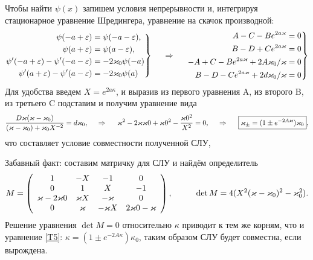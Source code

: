 Чтобы найти $\psi(x)$ запишем условия непрерывности и, интегрируя стационарное уравнение Шредингера, уравнение на скачок производной:
\begin{equation*}
    \left.\begin{aligned}
        \psi(-a+\varepsilon) &= \psi(-a-\varepsilon), \\
        \psi(a+\varepsilon) &= \psi(a-\varepsilon), \\
        \psi'(-a+\varepsilon) - \psi'(-a-\varepsilon) &= -2 \kappa_0 \psi(-a) \\
        \psi'(a+\varepsilon) - \psi'(a-\varepsilon) &= -2 \kappa_0 \psi(a) 
    \end{aligned}\right\}
    \hspace{0.5cm} \Rightarrow \hspace{0.5cm}
    \left.\begin{aligned}
        A - C - B e^{2 a \kappa} = 0 \\
        B - D + C e^{2 a \kappa} = 0 \\
        -A + C - B e^{2 a \kappa} + 2 A \kappa_0/\kappa = 0 \\
        B - D - C e^{2 a \kappa} + 2 d \kappa_0/\kappa = 0 \\
    \end{aligned}\right\}
\end{equation*}
Для удобства введем $X = e^{2 a \kappa}$, и выразив из первого уравнения A, из второго B, из третьего C подставим и получим уравнение вида
\begin{equation}
    \frac{D  \kappa (\kappa-\kappa_0)}{(\kappa-\kappa_0)+\kappa_0 X^{-2}} = d \kappa_0,
    \hspace{0.5cm} \Rightarrow \hspace{0.5cm}
    \kappa ^2-2 \kappa  \text{$\kappa $0}+\text{$\kappa $0}^2-\frac{\text{$\kappa $0}^2}{X^2}=0,
    \hspace{0.5cm} \Rightarrow \hspace{0.5cm}
    \boxed{
    \kappa_{\pm} = (1 \pm e^{-2 A \kappa}) \kappa_0
    },
    \label{T5}
\end{equation}
что составляет условие совместности полученной СЛУ,

Забавный факт: составим матричку для СЛУ и найдём определитель
\begin{equation*}
    M = \left(
    \begin{array}{cccc}
     1 & -X & -1 & 0 \\
     0 & 1 & X & -1 \\
     \kappa -2 \text{$\kappa $0} & \kappa  X & -\kappa  & 0 \\
     0 & \kappa  & -\kappa X & 2 \text{$\kappa $0}-\kappa  \\
    \end{array}
    \right), 
    \hspace{10 mm} \det M = 4 (X^2 (\kappa-\kappa_0)^2-\kappa_0^2).
\end{equation*}
Решение уравнения $\det M = 0$ относительно $\kappa$ приводит к тем же корням, что и уравнение \eqref{T5}: $ \kappa = (1 \pm e^{-2 A \kappa}) \kappa_0$, таким образом СЛУ будет совместна, если вырождена. 

